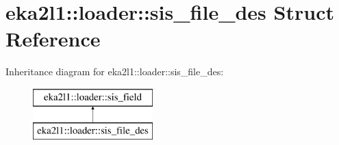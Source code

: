 \hypertarget{structeka2l1_1_1loader_1_1sis__file__des}{}\section{eka2l1\+:\+:loader\+:\+:sis\+\_\+file\+\_\+des Struct Reference}
\label{structeka2l1_1_1loader_1_1sis__file__des}
Inheritance diagram for eka2l1\+:\+:loader\+:\+:sis\+\_\+file\+\_\+des\+:\begin{figure}[H]
\begin{center}
\leavevmode
\includegraphics[height=2.000000cm]{structeka2l1_1_1loader_1_1sis__file__des}
\end{center}
\end{figure}
